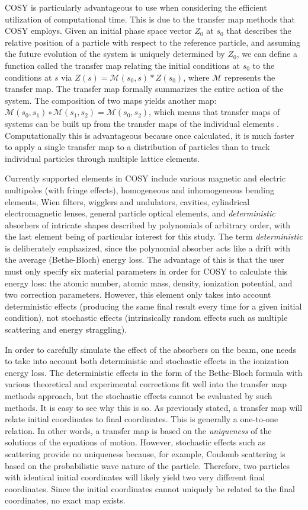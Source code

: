 \documentclass[a4paper,11pt]{article}
\begin{document}
COSY is particularly advantageous to use when considering the efficient utilization of computational time. This is due to the transfer map methods that COSY employs. Given an initial phase space vector $Z_0$ at $s_0$ that describes the relative position of a particle with respect to the reference particle, and assuming the future evolution of the system is uniquely determined by $Z_0$, we can define a function called the transfer map relating the initial conditions at $s_0$ to the conditions at $s$ via $Z(s)=\mathcal{M}(s_0,s)*Z(s_0)$, where $\mathcal{M}$ represents the transfer map. The transfer map formally summarizes the entire action of the system. The composition of two maps yields another map: $\mathcal{M}(s_0,s_1 )\circ\mathcal{M}(s_1,s_2 )=\mathcal{M}(s_0,s_2)$, which means that transfer maps of systems can be built up from the transfer maps of the individual elements \cite{berzMMM}. Computationally this is advantageous because once calculated, it is much faster to apply a single transfer map to a distribution of particles than to track individual particles through multiple lattice elements.

Currently supported elements in COSY include various magnetic and electric multipoles (with fringe effects), homogeneous and inhomogeneous bending elements, Wien filters, wigglers and undulators, cavities, cylindrical electromagnetic lenses, general particle optical elements, and \emph{deterministic} absorbers of intricate shapes described by polynomials of arbitrary order, with the last element being of particular interest for this study. The term \emph{deterministic} is deliberately emphasized, since the polynomial absorber acts like a drift with the average (Bethe-Bloch) energy loss. The advantage of this is that the user must only specify six material parameters in order for COSY to calculate this energy loss: the atomic number, atomic mass, density, ionization potential, and two correction parameters. However, this element only takes into account deterministic effects (producing the same final result every time for a given initial condition), not stochastic effects (intrinsically random effects such as multiple scattering and energy straggling).

In order to carefully simulate the effect of the absorbers on the beam, one needs to take into account both deterministic and stochastic effects in the ionization energy loss. The deterministic effects in the form of the Bethe-Bloch formula with various theoretical and experimental corrections fit well into the transfer map methods approach, but the stochastic effects cannot be evaluated by such methods. It is easy to see why this is so. As previously stated, a transfer map will relate initial coordinates to final coordinates. This is generally a one-to-one relation. In other words, a transfer map is based on the \textit{uniqueness} of the solutions of the equations of motion. However, stochastic effects such as scattering provide no uniqueness because, for example, Coulomb scattering is based on the probabilistic wave nature of the particle. Therefore, two particles with identical initial coordinates will likely yield two very different final coordinates. Since the initial coordinates cannot uniquely be related to the final coordinates, no exact map exists.
\end{document}

